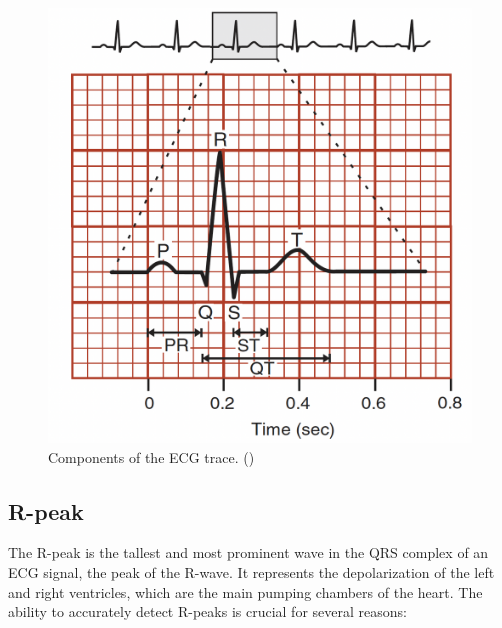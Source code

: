 \documentclass{mldsmsc}
\begin{document}
\begin{figure}[h!]
\centering
\includegraphics[width=1\linewidth]{images/ecg.png}
\caption{Components of the ECG trace. (\cite{alma991000225790601591})}
\label{fig:ecg-huszar}
\end{figure}

\subsection{R-peak}\label{sec:rpeaks}

The R-peak is the tallest and most prominent wave in the QRS complex of an ECG signal, the peak of the R-wave. It represents the depolarization of the left and right ventricles, which are the main pumping chambers of the heart. The ability to accurately detect R-peaks is crucial for several reasons:
\end{document}

